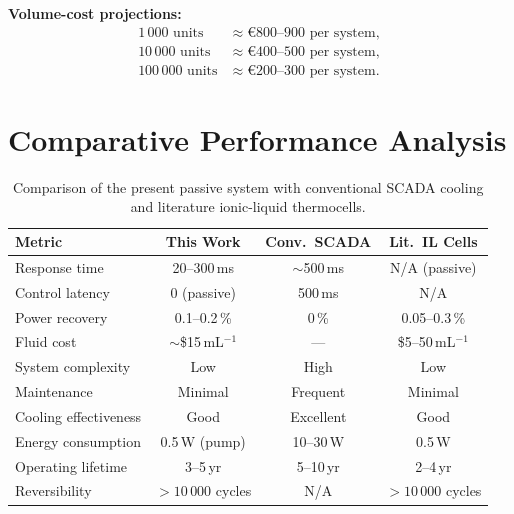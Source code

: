 \documentclass[11pt,a4paper]{article}
\begin{document}
\textbf{Volume-cost projections:}
\begin{align*}
1\,000\text{ units} &\approx €800\text{--}900\text{ per system},\\
10\,000\text{ units} &\approx €400\text{--}500\text{ per system},\\
100\,000\text{ units} &\approx €200\text{--}300\text{ per system}.
\end{align*}

\section{Comparative Performance Analysis}

\begin{table}[htbp]
\centering
\caption{Comparison of the present passive system with conventional SCADA cooling and literature ionic-liquid thermocells.}
\label{tab:comparison}
\small
\begin{tabular}{@{}lccc@{}}
\toprule
\rowcolor{lightblue}
\textbf{Metric} & \textbf{This Work} & \textbf{Conv.\ SCADA} & \textbf{Lit.\ IL Cells} \\
\midrule
Response time          & 20--300\,ms   & $\sim$500\,ms   & N/A (passive) \\
Control latency        & 0 (passive)   & 500\,ms         & N/A \\
Power recovery         & 0.1--0.2\,\%  & 0\,\%           & 0.05--0.3\,\% \\
Fluid cost             & $\sim$\$15\,mL$^{-1}$ & ---      & \$5--50\,mL$^{-1}$ \\
System complexity      & Low           & High            & Low \\
Maintenance            & Minimal       & Frequent        & Minimal \\
Cooling effectiveness  & Good          & Excellent       & Good \\
Energy consumption     & 0.5\,W (pump) & 10--30\,W       & 0.5\,W \\
Operating lifetime     & 3--5\,yr      & 5--10\,yr       & 2--4\,yr \\
Reversibility          & $>10\,000$ cycles & N/A         & $>10\,000$ cycles \\
\bottomrule
\end{tabular}
\end{table}
\end{document}

